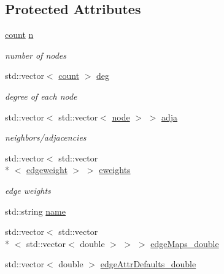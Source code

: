 \subsection*{Protected Attributes}
\begin{DoxyCompactItemize}
\item 
\hyperlink{namespace_ensemble_clustering_a2482e94ca22a0c6544a5a9173186fde8}{count} \hyperlink{class_ensemble_clustering_1_1_graph_a025fcfba990314b11b1f27d077b5319a}{n}
\begin{DoxyCompactList}\small\item\em number of nodes \end{DoxyCompactList}\item 
std\-::vector$<$ \hyperlink{namespace_ensemble_clustering_a2482e94ca22a0c6544a5a9173186fde8}{count} $>$ \hyperlink{class_ensemble_clustering_1_1_graph_a01f5bb5d01cdacd144c735939d7e8512}{deg}
\begin{DoxyCompactList}\small\item\em degree of each node \end{DoxyCompactList}\item 
std\-::vector$<$ std\-::vector$<$ \hyperlink{namespace_ensemble_clustering_ae829290aeccd1a420b17a37fd901f114}{node} $>$ $>$ \hyperlink{class_ensemble_clustering_1_1_graph_a98a545aec3f17b69ca7ecb68de17e11a}{adja}
\begin{DoxyCompactList}\small\item\em neighbors/adjacencies \end{DoxyCompactList}\item 
std\-::vector$<$ std\-::vector\\*
$<$ \hyperlink{namespace_ensemble_clustering_ab3fbffa545e4c22660e80229ca1a7d4a}{edgeweight} $>$ $>$ \hyperlink{class_ensemble_clustering_1_1_graph_a30b12d6bf4e817512b304cb9feb54122}{eweights}
\begin{DoxyCompactList}\small\item\em edge weights \end{DoxyCompactList}\item 
std\-::string \hyperlink{class_ensemble_clustering_1_1_graph_a519d6a3c44c3a6d8f46ba448cb691710}{name}
\item 
std\-::vector$<$ std\-::vector\\*
$<$ std\-::vector$<$ double $>$ $>$ $>$ \hyperlink{class_ensemble_clustering_1_1_graph_a2c6d3e520d36c058bd171671e6d217a2}{edge\-Maps\-\_\-double}
\item 
std\-::vector$<$ double $>$ \hyperlink{class_ensemble_clustering_1_1_graph_a485f434104cddb3d6fa7250ac0b29cf7}{edge\-Attr\-Defaults\-\_\-double}
\end{DoxyCompactItemize}
